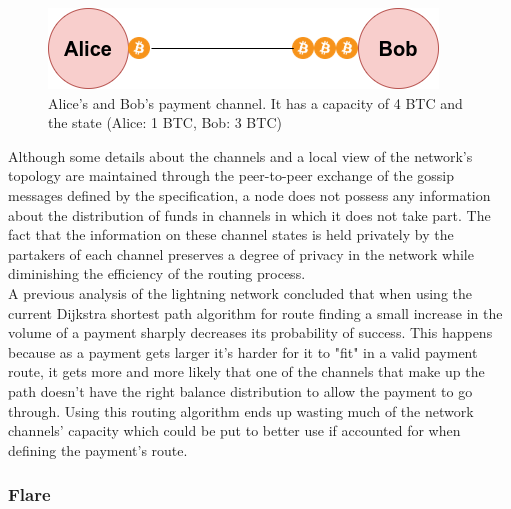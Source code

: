 \begin{figure}[H]
\begin{center}
  \includegraphics[width=0.6\linewidth]{images/alice_bob_channel.png}
  \caption{Alice's and Bob's payment channel. It has a capacity of 4 BTC and the state
(Alice: 1 BTC, Bob: 3 BTC)}
  \label{fig:payment_channel}
  \end{center}
\end{figure}

Although some details about the channels and a local view of the network's topology are maintained through the peer-to-peer exchange of the gossip messages defined by the specification, a node does not possess any information about the distribution of funds in channels in which it does not take part. The fact that the information on these channel states is held privately by the partakers of each channel preserves a degree of privacy in the network while diminishing the efficiency of the routing process. \\
A previous analysis of the lightning network \cite{ln_analysis} concluded that when using the current Dijkstra shortest path algorithm for route finding a small increase in the volume of a payment sharply decreases its probability of success. This happens because as a payment gets larger it's harder for it to "fit" in a valid payment route, it gets more and more likely that one of the channels that make up the path doesn't have the right balance distribution to allow the payment to go through. Using this routing algorithm ends up wasting much of the network channels' capacity which could be put to better use if accounted for when defining the payment's route.

\subsubsection{Flare}
\label{sssec:flare}

